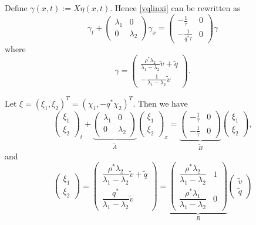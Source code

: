 \documentclass[preprint]{elsarticle}
\begin{document}
Define $\gamma(x,t) := X\eta(x,t)$. Hence \eqref{vqlinxi} can be rewritten as
\begin{equation} 
\gamma_t + \begin{pmatrix}
\lambda_1 & 0 \\
0 & \lambda_2
\end{pmatrix} \gamma_x = \begin{pmatrix}
-\frac{1}{\tau} & 0 \\
-\frac{1}{q^* \tau} & 0
\end{pmatrix} \gamma
\end{equation}
where 
\begin{equation}
\gamma = \begin{pmatrix}
\frac{\rho^*\lambda_2}{\lambda_1 - \lambda_2}\tilde{v} + \tilde{q} \\ 
-\frac{1}{\lambda_1 - \lambda_2}\tilde{v} 
\end{pmatrix}. 
\end{equation}

Let $\xi = (\xi_1, \xi_2)^T = (\chi_1, -q^*\chi_2)^T$. Then we have
\begin{equation} \label{vqlindiag}
\begin{pmatrix}
\xi_1 \\ \xi_2
\end{pmatrix}_t + 
\underset{\tilde{A}}{
	\underbrace{
	\begin{pmatrix}
		\lambda_1 & 0 \\
		0 & \lambda_2
	\end{pmatrix} 
	}
}
\begin{pmatrix}
\xi_1 \\ \xi_2
\end{pmatrix}_x = 
\underset{\tilde{B}}{
	\underbrace{
	\begin{pmatrix}
		-\frac{1}{\tau} & 0 \\
		-\frac{1}{\tau} & 0
	\end{pmatrix}}
}
\begin{pmatrix}
\xi_1 \\ \xi_2
\end{pmatrix},
\end{equation}
and
\begin{equation} \label{eq:Riemannzeta}
\begin{pmatrix}
\xi_1 \\ \xi_2
\end{pmatrix} = \begin{pmatrix}
\dfrac{\rho^*\lambda_2}{\lambda_1 - \lambda_2}\tilde{v} + \tilde{q} \\ 
\dfrac{q^*}{\lambda_1 - \lambda_2}\tilde{v} 
\end{pmatrix} = 
\underset{R}{
\underbrace{
	\begin{pmatrix}
		\dfrac{\rho^*\lambda_2}{\lambda_1-\lambda_2} & 1\\
		\dfrac{\rho^*\lambda_1}{\lambda_1-\lambda_2} & 0
	\end{pmatrix}
	}
}
\begin{pmatrix}
	\tilde{v} \\ \tilde{q} 
\end{pmatrix}
\end{equation}
\end{document}
